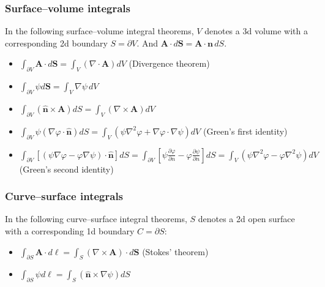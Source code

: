 \subsubsection{Surface–volume integrals}
In the following surface–volume integral theorems, $V$ denotes a 3d volume with
a corresponding 2d boundary $S = \partial V$. And
$\mathbf{A}\cdot d\mathbf{S}=\mathbf{A}\cdot\mathbf{n}\, dS$.
\begin{itemize}
\item
  $\int_{\partial V} \mathbf{A}\cdot d\mathbf{S}=
  \int_V \left(\nabla\cdot\mathbf{A}\right)dV$ (Divergence theorem)
\item
  $\int_{\partial V}\psi d \mathbf{S} = \int_V \nabla \psi\, dV$
\item
  $\int_{\partial V}\left(\hat{\mathbf{n}}\times\mathbf{A}\right)dS=
  \int _{V}\left(\nabla\times\mathbf{A}\right)dV$
\item
  $\int_{\partial V}\psi\left(\nabla\varphi\cdot\hat{\mathbf{n}}\right)dS =
  \int _{V}\left(\psi\nabla^{2}\varphi+\nabla\varphi\cdot\nabla\psi\right)dV$
  (Green's first identity)
\item
  $\int_{\partial V}\left[\left(\psi\nabla\varphi
  -\varphi\nabla\psi\right)\cdot\hat{\mathbf{n}}\right]dS=
  \int_{\partial V}\left[\psi\frac{\partial\varphi}{\partial n}
    -\varphi\frac{\partial\psi}{\partial n}\right]dS
  =\int_{V}\left(\psi\nabla^{2}\varphi-\varphi\nabla^{2}\psi\right)dV$
  (Green's second identity)
\end{itemize}

\subsubsection{Curve–surface integrals}
In the following curve–surface integral theorems, $S$ denotes a 2d open surface
with a corresponding 1d boundary $C = \partial S$:
\begin{itemize}
\item
  $\int_{\partial S}\mathbf{A}\cdot d\boldsymbol{\ell}=
  \int_{S}\left(\nabla\times\mathbf{A}\right)\cdot d\mathbf{S}$
  (Stokes' theorem)
\item
  $\int_{\partial S}\psi d\boldsymbol{\ell}
  =\int_{S}\left(\hat{\mathbf{n}}\times\nabla\psi\right)dS$
\end{itemize}
